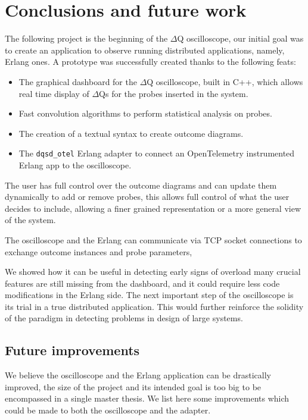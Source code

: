 \chapter{Conclusions and future work}
The following project is the beginning of the $\Delta$Q oscilloscope, our initial goal was to create an application to observe running distributed applications, namely, Erlang ones.
    A prototype was successfully created thanks to the following feats:
    \begin{itemize}
        \item The graphical dashboard for the $\Delta$Q oscilloscope, built in C++, which allows real time display of $\Delta$Qs for the probes inserted in the system.
        \item Fast convolution algorithms to perform statistical analysis on probes.
        \item The creation of a textual syntax to create outcome diagrams.
        \item The \texttt{dqsd\_otel} Erlang adapter to connect an OpenTelemetry instrumented Erlang app to the oscilloscope.
    \end{itemize}

    The user has full control over the outcome diagrams and can update them dynamically to add or remove probes, this allows full control of what the user decides to include, allowing a finer grained representation or a more general view of the system.  

    The oscilloscope and the Erlang can communicate via TCP socket connections to exchange outcome instances and probe parameters,

    We showed how it can be useful in detecting early signs of overload many crucial features are still missing from the dashboard, and it could require less code modifications in the Erlang side. The next important step of the oscilloscope is its trial in a true distributed application. This would further reinforce the solidity of the paradigm in detecting problems in design of large systems. 

    \section{Future improvements}
        We believe the oscilloscope and the Erlang application can be drastically improved, the size of the project and its intended goal is too big to be encompassed in a single master thesis. We list here some improvements which could be made to both the oscilloscope and the adapter.
